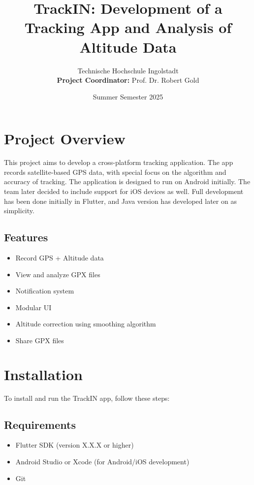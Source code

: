 \documentclass[12pt]{article}
\title{TrackIN: Development of a Tracking App and Analysis of Altitude Data}
\author{Technische Hochschule Ingolstadt \\ \textbf{Project Coordinator:} Prof. Dr. Robert Gold}
\date{Summer Semester 2025}
\begin{document}
\maketitle
\tableofcontents
\newpage

\section{Project Overview}
This project aims to develop a cross-platform tracking application. The app records satellite-based GPS data, with special focus on the algorithm and accuracy of tracking. The application is designed to run on Android initially. The team later decided to include support for iOS devices as well. Full development has been done initially in Flutter, and Java version has developed later on as simplicity. 

\subsection*{Features}
\begin{itemize}
    \item Record GPS + Altitude data
    \item View and analyze GPX files
    \item Notification system
    \item Modular UI
    \item Altitude correction using smoothing algorithm
    \item Share GPX files
\end{itemize}

\section{Installation}
To install and run the TrackIN app, follow these steps:

\subsection*{Requirements}
\begin{itemize}
    \item Flutter SDK (version X.X.X or higher)
    \item Android Studio or Xcode (for Android/iOS development)
    \item Git
\end{itemize}
\end{document}
